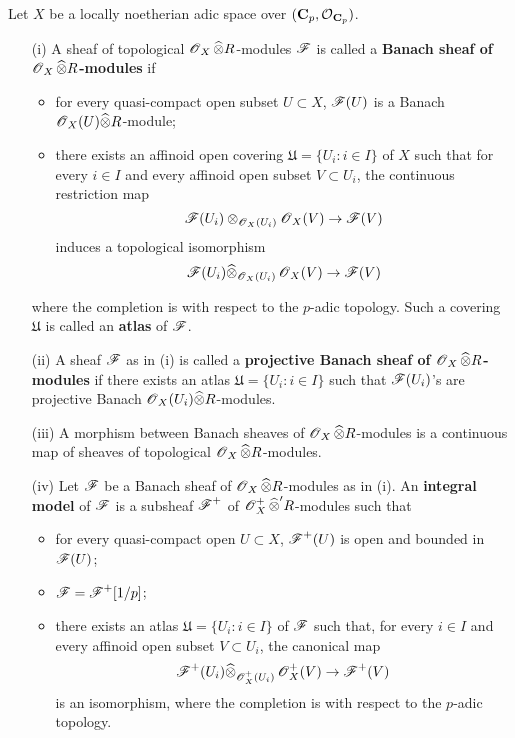 \begin{Definition}\label{Definition: Banach sheaf}
Let $X$ be a locally noetherian adic space over $(\operatorname{\mathbf{C}}_p, \operatorname{\mathcal{O}}_{\operatorname{\mathbf{C}}_p})$.
\begin{enumerate}
\item[(i)] A sheaf of topological $\operatorname{\mathscr{O}}_{X}\widehat{\otimes} R$-modules $\operatorname{\mathscr{F}}$ is called a \textbf{Banach sheaf of $\operatorname{\mathscr{O}}_{X}\widehat{\otimes} R$-modules} if 
\begin{itemize}
\item for every quasi-compact open subset $U\subset X$, $\operatorname{\mathscr{F}}(U)$ is a Banach $\operatorname{\mathscr{O}}_X(U)\widehat{\otimes} R$-module;
\item there exists an affinoid open covering $\mathfrak{U}=\{U_i: i\in I\}$ of $X$ such that for every $i\in I$ and every affinoid open subset $V\subset U_i$, the continuous restriction map
\[\operatorname{\mathscr{F}}(U_i)\otimes_{\operatorname{\mathscr{O}}_X(U_i)}\operatorname{\mathscr{O}}_X(V)\rightarrow \operatorname{\mathscr{F}}(V)\]
induces a topological isomorphism
\[\operatorname{\mathscr{F}}(U_i)\widehat{\otimes}_{\operatorname{\mathscr{O}}_X(U_i)}\operatorname{\mathscr{O}}_X(V)\rightarrow \operatorname{\mathscr{F}}(V)\]
\end{itemize}
where the completion is with respect to the $p$-adic topology. Such a covering $\mathfrak{U}$ is called an \textbf{atlas} of $\operatorname{\mathscr{F}}$.
\item[(ii)] A sheaf $\operatorname{\mathscr{F}}$ as in (i) is called a \textbf{projective Banach sheaf of $\operatorname{\mathscr{O}}_X\widehat{\otimes} R$-modules} if there exists an atlas $\mathfrak{U}=\{U_i: i\in I\}$ such that $\operatorname{\mathscr{F}}(U_i)$'s are projective Banach $\operatorname{\mathscr{O}}_X(U_i)\widehat{\otimes}R$-modules. 
\item[(iii)] A morphism between Banach sheaves of $\operatorname{\mathscr{O}}_X\widehat{\otimes}R$-modules is a continuous map of sheaves of topological $\operatorname{\mathscr{O}}_X\widehat{\otimes}R$-modules.
\item[(iv)] Let $\operatorname{\mathscr{F}}$ be a Banach sheaf of $\operatorname{\mathscr{O}}_X\widehat{\otimes}R$-modules as in (i). An \textbf{integral model} of $\operatorname{\mathscr{F}}$ is a subsheaf $\operatorname{\mathscr{F}}^+$ of $\operatorname{\mathscr{O}}^+_X\widehat{\otimes}'R$-modules such that
\begin{itemize}
\item for every quasi-compact open $U\subset X$, $\operatorname{\mathscr{F}}^+(U)$ is open and bounded in $\operatorname{\mathscr{F}}(U)$;
\item $\operatorname{\mathscr{F}}=\operatorname{\mathscr{F}}^+[1/p]$;
\item there exists an atlas $\mathfrak{U}=\{U_i:i\in I\}$ of $\operatorname{\mathscr{F}}$ such that, for every $i\in I$ and every affinoid open subset $V\subset U_i$, the canonical map
\[\operatorname{\mathscr{F}}^+(U_i)\widehat{\otimes}_{\operatorname{\mathscr{O}}^+_X(U_i)}\operatorname{\mathscr{O}}^+_X(V)\rightarrow \operatorname{\mathscr{F}}^+(V)\]
is an isomorphism, where the completion is with respect to the $p$-adic topology.
\end{itemize}
\end{enumerate}
\end{Definition}

